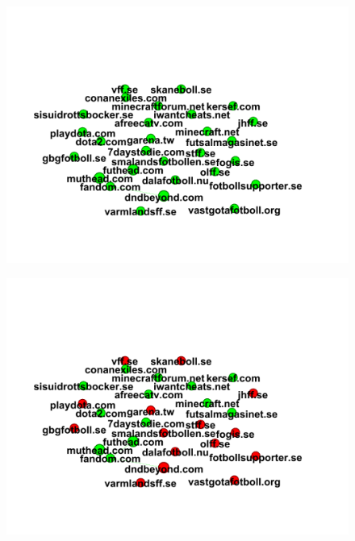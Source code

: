 \documentclass[conference]{IEEEtran}
\begin{document}
\begin{figure}[htbp]
 \centerline{\includegraphics[width=\columnwidth]{figs/05before.png}}
 \caption{}
\end{figure}

\begin{figure}[htbp]
 \centerline{\includegraphics[width=\columnwidth]{figs/05after.png}}
 \caption{}
\end{figure}
\end{document}
